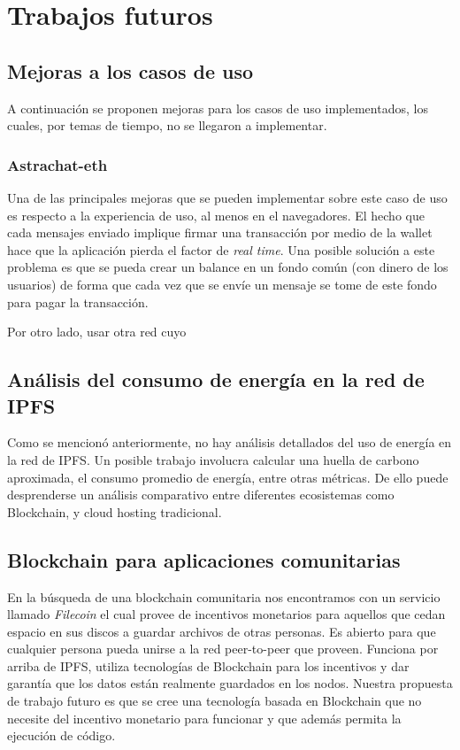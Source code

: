 \section{Trabajos futuros}

\subsection{Mejoras a los casos de uso}

A continuación se proponen mejoras para los casos de uso implementados, los cuales, por temas de tiempo, no se llegaron a implementar.

\subsubsection{Astrachat-eth}

Una de las principales mejoras que se pueden implementar sobre este caso de uso es respecto a la experiencia de uso, al menos en el navegadores. El hecho que cada mensajes enviado implique firmar una transacción por medio de la wallet hace que la aplicación pierda el factor de \textit{real time}. Una posible solución a este problema es que se pueda crear un balance en un fondo común (con dinero de los usuarios) de forma que cada vez que se envíe un mensaje se tome de este fondo para pagar la transacción.

Por otro lado, usar otra red cuyo


\subsection{Análisis del consumo de energía en la red de IPFS}

Como se mencionó anteriormente, no hay análisis detallados del uso de energía en la red de IPFS. Un posible trabajo involucra calcular una huella de carbono aproximada, el consumo promedio de energía, entre otras métricas. De ello puede desprenderse un análisis comparativo entre diferentes ecosistemas como Blockchain, y cloud hosting tradicional.

\subsection{Blockchain para aplicaciones comunitarias}

En la búsqueda de una blockchain comunitaria nos encontramos con un servicio llamado \textit{Filecoin}\cite{filecoin} el cual provee de incentivos monetarios para aquellos que cedan espacio en sus discos a guardar archivos de otras personas. Es abierto para que cualquier persona pueda unirse a la red peer-to-peer que proveen. Funciona por arriba de IPFS, utiliza tecnologías de Blockchain para los incentivos y dar garantía que los datos están realmente guardados en los nodos. Nuestra propuesta de trabajo futuro es que se cree una tecnología basada en Blockchain que no necesite del incentivo monetario para funcionar y que además permita la ejecución de código.


